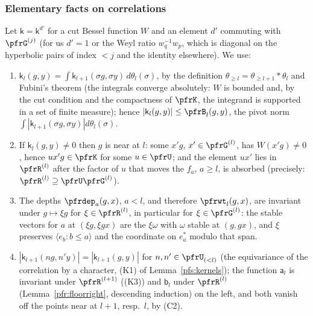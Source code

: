 \documentclass[10pt]{amsart}
\theoremstyle{definition}
\theoremstyle{remark}
\begin{document}
\subsubsection*{Elementary facts on correlations}
Let $\mathsf k=\mathsf k^{d'}$ for a cut Bessel function $W$ and an element $d'$ commuting with
$\pfrG^{(j)}$ (for us $d'=1$ or the Weyl ratio $w_q^{-1}w_p$, which is diagonal on the hyperbolic
pairs of index $<j$ and the identity elsewhere). We use:
\begin{enumerate}
\item[(C1)] $\mathsf k_l(g,y)=\int\mathsf k_{l+1}(\sigma g,\sigma y)\,d\theta_l(\sigma)$, by the
definition $\theta_{\ge l}=\theta_{\ge l+1}*\theta_l$ and Fubini's theorem (the integrals converge
absolutely: $W$ is bounded and, by the cut condition and the compactness of $\pfrK$, the integrand is
supported in a set of finite measure); hence $|\mathsf k_l(g,y)|\le\pfrB_l(g,y)$, the pivot norm
$\int|\mathsf k_{l+1}(\sigma g,\sigma y)|d\theta_l(\sigma)$.
\item[(C2)] If $\mathsf k_l(g,y)\ne0$ then $g$ is near at $l$: some $x'g$, $x'\in\pfrG^{(l)}$, has
$W(x'g)\ne0$, hence $ux'g\in\pfrK$ for some $u\in\pfrU$; and the element $ux'$ lies in $\pfrR^{(l)}$
after the factor of $u$ that moves the $f_a$, $a\ge l$, is absorbed (precisely: $\pfrR^{(l)}\supseteq
\pfrU\pfrG^{(l)}$).
\item[(C3)] The depths $\pfrdep_a(g,x)$, $a<l$, and therefore $\pfrwt_l(g,x)$, are invariant under
$g\mapsto\xi g$ for $\xi\in\pfrR^{(l)}$, in particular for $\xi\in\pfrG^{(l)}$: the stable vectors for
$a$ at $(\xi g,\xi gx)$ are the $\xi\omega$ with $\omega$ stable at $(g,gx)$, and $\xi$ preserves
$\langle e_b:b\le a\rangle$ and the coordinate on $e^*_a$ modulo that span.
\item[(C4)] $|\mathsf k_{l+1}(ng,n'y)|=|\mathsf k_{l+1}(g,y)|$ for $n,n'\in\pfrU_{(<l)}$ (the equivariance of
the correlation by a character, (K1) of Lemma~\ref{pfs:kernels}); the function $\mathsf a_l$ is invariant under
$\pfrR^{(l+1)}$ ((K3)) and $\mathsf b_l$ under $\pfrR^{(l)}$ (Lemma~\ref{pfr:floorright}, descending induction) on the
left, and both vanish off the points near at $l+1$, resp.\ $l$, by (C2).
\end{enumerate}
\end{document}
